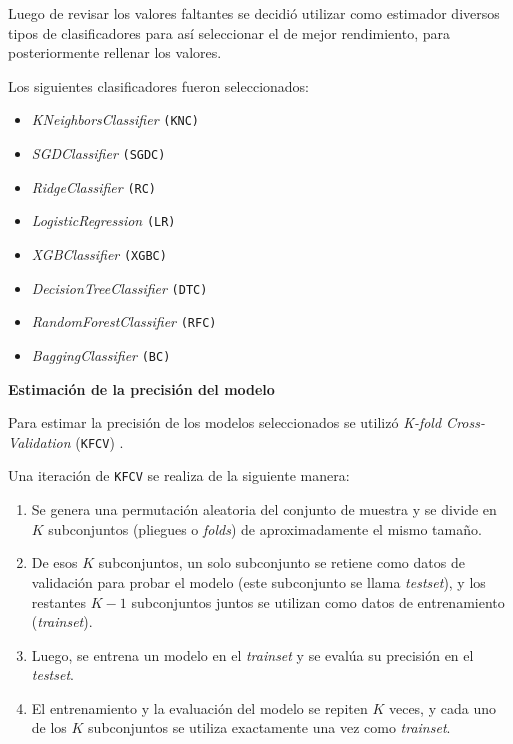 \documentclass[a4paper,12pt]{article}
\begin{document}
		Luego de revisar los valores faltantes se decidió utilizar como estimador diversos tipos de clasificadores para así seleccionar el de mejor rendimiento, para posteriormente rellenar los valores.
		
		Los siguientes clasificadores fueron seleccionados:
		
		\begin{itemize}[noitemsep, topsep=2pt]
			\item \textit{KNeighborsClassifier} \texttt{(KNC)}
			\item \textit{SGDClassifier} \texttt{(SGDC)}
			\item \textit{RidgeClassifier} \texttt{(RC)}
			\item \textit{LogisticRegression} \texttt{(LR)}
			\item \textit{XGBClassifier} \texttt{(XGBC)}
			\item \textit{DecisionTreeClassifier} \texttt{(DTC)}
			\item \textit{RandomForestClassifier} \texttt{(RFC)}
			\item \textit{BaggingClassifier} \texttt{(BC)}
		\end{itemize}
		
		\hfill
		
		\textbf{Estimación de la precisión del modelo}
		
		Para estimar la precisión de los modelos seleccionados se utilizó \textit{K-fold Cross-Validation} (\texttt{KFCV}) \citep{kfolds}.
		
		Una iteración de \texttt{KFCV} se realiza de la siguiente manera: 
		
		\begin{enumerate}[noitemsep, topsep=2pt]
			\item Se genera una permutación aleatoria del conjunto de muestra y se divide en $K$ subconjuntos (pliegues o \textit{folds}) de aproximadamente el mismo tamaño.
			\item De esos $K$ subconjuntos, un solo subconjunto se retiene como datos de validación para probar el modelo (este subconjunto se llama \textit{testset}), y los restantes $K-1$ subconjuntos juntos se utilizan como datos de entrenamiento (\textit{trainset}).
			\item Luego, se entrena un modelo en el \textit{trainset} y se evalúa su precisión en el \textit{testset}. 
			\item El entrenamiento y la evaluación del modelo se repiten $K$ veces, y cada uno de los $K$ subconjuntos se utiliza exactamente una vez como \textit{trainset}.
		\end{enumerate}
		
\end{document}
